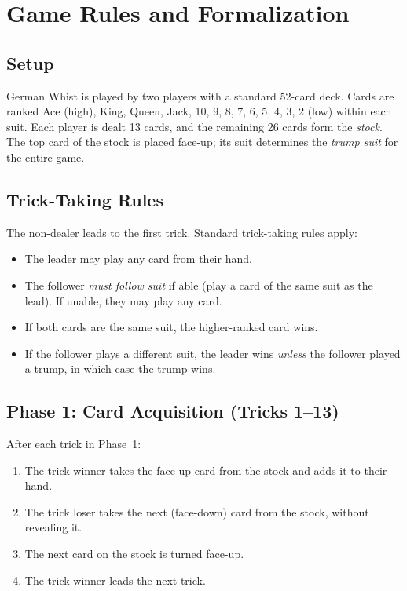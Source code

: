 \section{Game Rules and Formalization}
\label{sec:rules}

\subsection{Setup}

German Whist is played by two players with a standard 52-card deck. Cards are
ranked Ace (high), King, Queen, Jack, 10, 9, 8, 7, 6, 5, 4, 3, 2 (low) within
each suit. Each player is dealt 13 cards, and the remaining 26 cards form the
\emph{stock}. The top card of the stock is placed face-up; its suit determines
the \emph{trump suit} for the entire game.

\subsection{Trick-Taking Rules}

The non-dealer leads to the first trick. Standard trick-taking rules apply:
\begin{itemize}
  \item The leader may play any card from their hand.
  \item The follower \emph{must follow suit} if able (play a card of the same
    suit as the lead). If unable, they may play any card.
  \item If both cards are the same suit, the higher-ranked card wins.
  \item If the follower plays a different suit, the leader wins
    \emph{unless} the follower played a trump, in which case the trump wins.
\end{itemize}

\subsection{Phase 1: Card Acquisition (Tricks 1--13)}

After each trick in Phase~1:
\begin{enumerate}
  \item The trick winner takes the face-up card from the stock and adds it to
    their hand.
  \item The trick loser takes the next (face-down) card from the stock,
    without revealing it.
  \item The next card on the stock is turned face-up.
  \item The trick winner leads the next trick.
\end{enumerate}

